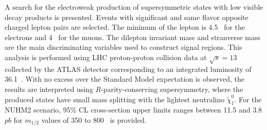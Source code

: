 A search for the electroweak production of supersymmetric states with low \pt visible decay products is presented.
Events with significant \met and same flavor opposite charged lepton pairs are selected.
The minimum \pt of the lepton is 4.5~{\GeV} for the electrons and 4~{\GeV} for the muons.
The dilepton invariant mass and stranverse mass are the main discriminating variables used to construct signal regions.
This analysis is performed using LHC proton-proton collision data at $\sqrt{s} = 13$~{\TeV} collected by the ATLAS detector corresponding to an integrated luminosity of 36.1~\ifb.
With no excess over the Standard Model expectation is observed, the results are interpreted using $R$-parity-conserving supersymmetry, where the produced states have small mass splitting with the lightest neutralino $\widetilde{\chi}^{0}_{1}$.
For the NUHM2 scenario, 95\% CL cross-section upper limits ranges between 11.5 and 3.8 $pb$ for $m_{1/2}$ values of 350 to 800~{\GeV} is provided.
